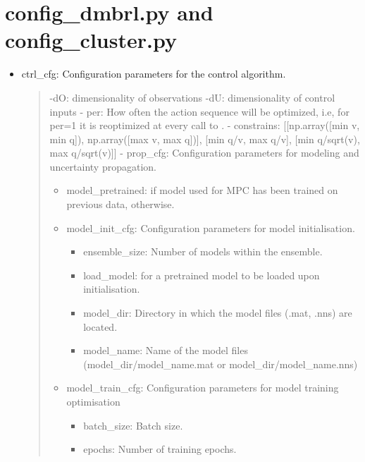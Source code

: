 \documentclass[letterpaper,10pt,english,openany,oneside]{sphinxmanual}
\begin{document}
\section{config\_dmbrl.py and config\_cluster.py}
\label{\detokenize{config:config-dmbrl-py-and-config-cluster-py}}\begin{itemize}
\item {} 
ctrl\_cfg: Configuration parameters for the control algorithm.
\begin{quote}

-dO: dimensionality of observations
-dU: dimensionality of control inputs
- per: How often the action sequence will be optimized, i.e, for per=1 it is reoptimized at every call to .
- constrains: {[}{[}np.array({[}min v, min q{]}), np.array({[}max v, max q{]}){]}, {[}min q/v, max q/v{]}, {[}min q/sqrt(v), max q/sqrt(v){]}{]}
- prop\_cfg: Configuration parameters for modeling and uncertainty propagation.
\begin{itemize}
\item {} 
model\_pretrained:  if model used for MPC has been trained on previous data,  otherwise.

\item {} 
model\_init\_cfg: Configuration parameters for model initialisation.
\begin{itemize}
\item {} 
ensemble\_size: Number of models within the ensemble.

\item {} 
load\_model:  for a pretrained model to be loaded upon initialisation.

\item {} 
model\_dir: Directory in which the model files (.mat, .nns) are located.

\item {} 
model\_name: Name of the model files (model\_dir/model\_name.mat or model\_dir/model\_name.nns)

\end{itemize}

\item {} 
model\_train\_cfg: Configuration parameters for model training optimisation
\begin{itemize}
\item {} 
batch\_size: Batch size.

\item {} 
epochs: Number of training epochs.


\end{itemize}
\end{itemize}
\end{quote}
\end{itemize}
\end{document}
